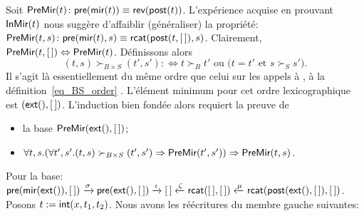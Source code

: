 Soit \(\textsf{PreMir}({t}) \colon \textsf{pre}(\textsf{mir}(t)) \equiv
\textsf{rev}(\textsf{post}(t))\).
L'expérience acquise en prouvant \(\textsf{InMir}({t})\) nous suggère
d'affaiblir (généraliser) la propriété: \(\textsf{PreMir}({t,s}) \colon
\textsf{pre}(\textsf{mir}(t),s) \equiv
\textsf{rcat}(\textsf{post}(t,[\,]),s)\).
Clairement, \(\textsf{PreMir}({t,[\,]}) \Leftrightarrow
\textsf{PreMir}({t})\). Définissons alors
\begin{equation*}
  (t,s) \succ_{B \times S} (t',s') :\Leftrightarrow \text{\(t \succ_{B}
    t'\) ou (\(t = t'\) et \(s \succ_{S} s'\))}.
\end{equation*}
Il s'agit là essentiellement du même ordre que celui sur les appels à
, à la
définition~\eqref{eq_BS_order} . L'élément
minimum pour cet ordre lexicographique est
\((\textsf{ext}(),[\,])\). L'induction bien fondée alors requiert la
preuve de
\begin{itemize}

  \item la base \(\textsf{PreMir}({\textsf{ext}(),[\,]})\);

  \item \(\forall t,s. (\forall t',s'.(t,s) \succ_{B \times S} (t',s')
    \Rightarrow \textsf{PreMir}({t',s'})) \Rightarrow
    \textsf{PreMir}({t,s})\).

\end{itemize}
Pour la base: 
\(\textsf{pre}(\textsf{mir}(\textsf{ext}()),[\,]) \xrightarrow{\smash{\sigma}}
\textsf{pre}(\textsf{ext}(),[\,]) \xrightarrow{\smash{\iota}} [\,]
\xleftarrow{\smash{\zeta}} \textsf{rcat}([\,],[\,])
\xleftarrow{\smash{\mu}}
\textsf{rcat}(\textsf{post}(\textsf{ext}(),[\,]),[\,])\). Posons \(t :=
\textsf{int}(x,t_1,t_2)\). %
Nous avons les réécritures du membre gauche suivantes:
